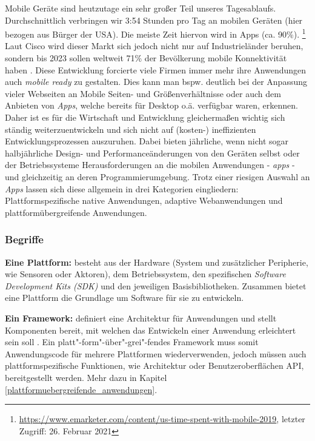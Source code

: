 \label{sec:mobile_development}
Mobile Geräte sind heutzutage ein sehr großer Teil unseres Tagesablaufs. Durchschnittlich verbringen wir 3:54 Stunden pro Tag an mobilen Geräten (hier bezogen aus Bürger der USA). Die meiste Zeit hiervon wird in Apps (ca. 90\%). \footnote{\url{https://www.emarketer.com/content/us-time-spent-with-mobile-2019}, letzter Zugriff: 26. Februar 2021}
Laut Cisco wird dieser Markt sich jedoch nicht nur auf Industrieländer beruhen, sondern bis 2023 sollen weltweit 71\% der Bevölkerung mobile Konnektivität haben \cite{cisco2020}.
Diese Entwicklung forcierte viele Firmen immer mehr ihre Anwendungen auch \textit{mobile ready} zu gestalten. Dies kann man bspw. deutlich bei der Anpassung vieler Webseiten an Mobile Seiten- und Größenverhältnisse oder auch dem Anbieten von \textit{Apps}, welche bereits für Desktop o.ä. verfügbar waren, erkennen. \\

\noindent
Daher ist es für die Wirtschaft und Entwicklung gleichermaßen wichtig sich ständig weiterzuentwickeln und sich nicht auf (kosten-) ineffizienten Entwicklungsprozessen auszuruhen. Dabei bieten jährliche, wenn nicht sogar halbjährliche Design- und Performanceänderungen von den Geräten selbst oder der Betriebssysteme Herausforderungen an die mobilen Anwendungen - \textit{apps} - und gleichzeitig an deren Programmierumgebung. Trotz einer riesigen Auswahl an \textit{Apps} lassen sich diese allgemein in drei Kategorien eingliedern: Plattformspezifische native Anwendungen, adaptive Webanwendungen und plattformübergreifende Anwendungen.

\subsubsection{Begriffe}
\noindent
{}
\textbf{Eine Plattform:} besteht aus der Hardware (System und zusätzlicher Peripherie, wie Sensoren oder Aktoren), dem Betriebssystem, den spezifischen \textit{Software Development Kits (SDK)} und den jeweiligen Basisbibliotheken. 
Zusammen bietet eine Plattform die Grundlage um Software für sie zu entwickeln.

\noindent
{}
\textbf{Ein Framework:} definiert eine Architektur für Anwendungen und stellt Komponenten bereit, mit welchen das Entwickeln einer Anwendung erleichtert sein soll \cite{johnson1988}.
Ein platt"-form"-über"-grei"-fendes Framework muss somit Anwendungscode für mehrere Plattformen wiederverwenden, jedoch müssen auch plattformspezifische Funktionen, wie Architektur oder Benutzeroberflächen API, bereitgestellt werden. Mehr dazu in Kapitel \ref{plattformuebergreifende_anwendungen}.


